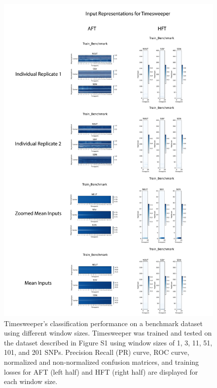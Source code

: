 \begin{figure}
    \centering
    \includegraphics[width=\textwidth]{figures/ap1/S1_All_Inputs.pdf}
    \caption[Timesweeper’s classification performance on a benchmark dataset using different window sizes.]{Timesweeper’s classification performance on a benchmark dataset using different window sizes. Timesweeper was trained and tested on the dataset described in Figure S1 using window sizes of 1, 3, 11, 51, 101, and 201 SNPs. Precision Recall (PR) curve, ROC curve, normalized and non-normalized confusion matrices, and training losses for AFT (left half) and HFT (right half) are displayed for each window size.}
    \label{fig:S1_All_Inputs}
\end{figure}

